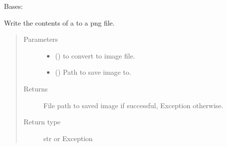 \documentclass[letterpaper,10pt,english]{sphinxmanual}
\begin{document}
\begin{fulllineitems}
\label{\detokenize{polo.utils:polo.utils.io_utils.SceneExporter}}
Bases: 

\begin{fulllineitems}
\label{\detokenize{polo.utils:polo.utils.io_utils.SceneExporter.write}}
\end{fulllineitems}


\begin{fulllineitems}
\label{\detokenize{polo.utils:polo.utils.io_utils.SceneExporter.write_image}}
Write the contents of a 
to a png file.
\begin{quote}\begin{description}
\item[{Parameters}] \leavevmode\begin{itemize}
\item {} 
 () \textendash{}  to convert to image file.

\item {} 
 () \textendash{} Path to save image to.

\end{itemize}

\item[{Returns}] \leavevmode
File path to saved image if successful, Exception otherwise.

\item[{Return type}] \leavevmode
str or Exception

\end{description}\end{quote}

\end{fulllineitems}


\end{fulllineitems}
\end{document}
